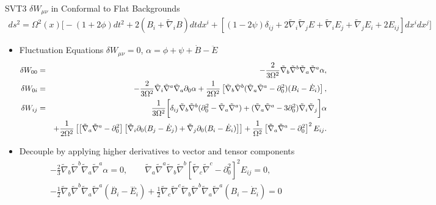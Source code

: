 \documentclass[8pt,aspectratio=1610]{beamer}
\begin{document}
\begin{frame}{SVT3 $\delta W_{\mu\nu}$ in Conformal to Flat Backgrounds}
	\begin{eqnarray}
	ds^2 = \Omega^2(x)\bigg[-(1+2\phi)dt^2 + 2(B_i + \tilde\nabla_i B)dt dx^i 
	+ [(1-2\psi)\delta_{ij} + 2\tilde\nabla_i \tilde\nabla_j E + \tilde\nabla_i E_j + \tilde\nabla_j E_i + 2E_{ij}]dx^i dx^j\bigg]
	\end{eqnarray}
	\begin{itemize}
		\item Fluctuation Equations $\delta W_{\mu\nu} = 0$, $\alpha=\phi + \psi +\dot{B}-\ddot{E}$
		\begin{eqnarray}
		\delta W_{00}  &=& -\frac{2}{3\Omega^2} \tilde{\nabla}_{b}\tilde{\nabla}^{b}\tilde{\nabla}_{a}\tilde{\nabla}^{a}\alpha,
		\nonumber\\	
		\delta W_{0i} &=&  -\frac{2}{3\Omega^2} \tilde{\nabla}_i\tilde{\nabla}^a\tilde{\nabla}_a\partial_0\alpha
		+\frac{1}{2\Omega^2}\left[\tilde{\nabla}_{b}\tilde{\nabla}^b(\tilde{\nabla}_a\tilde{\nabla}^a-\partial_0^2)(B_i - \dot{E}_i)\right],
		\nonumber\\	
		\delta W_{ij}  &=& \frac{1}{3\Omega^2}\bigg{[} \delta_{ij}\tilde{\nabla}_{b}\tilde{\nabla}^b (\partial_0^2 - \tilde{\nabla}_a\tilde{\nabla}^a) 
		+(\tilde{\nabla}_{a}\tilde{\nabla}^a -3\partial_0^2)\tilde{\nabla}_i\tilde{\nabla}_j  
		\bigg{] }\alpha
		\\
		&&+\frac{1}{2\Omega^2}\left[ \left[\tilde{\nabla}_{a}\tilde{\nabla}^a -\partial_0^2\right]\left[\tilde{\nabla}_i   \partial_0(B_j - \dot{E}_j)+ \tilde{\nabla}_j \partial_0(B_i - \dot{E}_i)\right] \right]
		+\frac{1}{\Omega^2}\left[\tilde{\nabla}_a\tilde{\nabla}^a-\partial_0^2\right]^2E_{ij}.
		\nonumber
		\end{eqnarray}
		\item Decouple by applying higher derivatives to vector and tensor components
		\begin{eqnarray}
		- \tfrac{2}{3} \tilde{\nabla}_{b}\tilde{\nabla}^{b}\tilde{\nabla}_{a}\tilde{\nabla}^{a}\alpha=0,
		\qquad
		\tilde\nabla_a \tilde\nabla^a \tilde\nabla_b \tilde\nabla^b\left[\tilde\nabla_c \tilde\nabla^c - \partial_0^2\right]^2E_{ij}=0,
		\nonumber\\
		- \tfrac{1}{2} \tilde{\nabla}_{b}\tilde{\nabla}^{b}\tilde{\nabla}_{a}\tilde{\nabla}^{a}(\overset{..}{B}_{i}-\overset{...}{E}_{i}) + \tfrac{1}{2} \tilde{\nabla}_{c}\tilde{\nabla}^{c}\tilde{\nabla}_{b}\tilde{\nabla}^{b}\tilde{\nabla}_{a}\tilde{\nabla}^{a}(B_{i} -\dot{E}_{i})=0
		\end{eqnarray}
	\end{itemize}
\end{frame}
\end{document}
